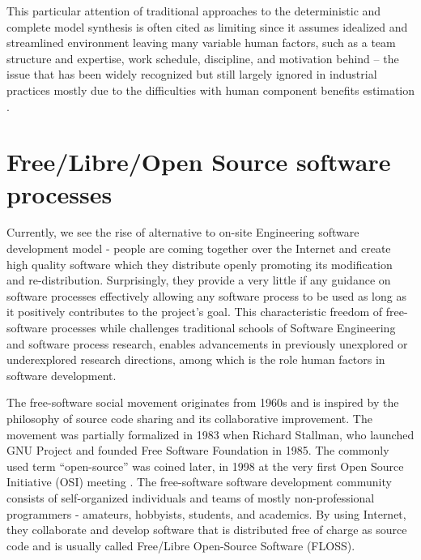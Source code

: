 This particular attention of traditional approaches to the deterministic and complete model synthesis 
is often cited as limiting since it assumes idealized and streamlined environment leaving many variable 
human factors, such as a team structure and expertise, work schedule, discipline, and motivation behind 
-- the issue that has been widely recognized 
\cite{citeulike:149387} \cite{citeulike:113403} \cite{citeulike:205322} \cite{citeulike:12798652} 
but still largely ignored in industrial practices mostly due to the  difficulties with human component 
benefits estimation \cite{citeulike:12798659} \cite{citeulike:12798662} \cite{csdl2-12-11}.

%
%
\section{Free/Libre/Open Source software processes}
Currently, we see the rise of alternative to on-site Engineering software development model - 
people are coming together over the Internet and create high quality software which they distribute 
openly promoting its modification and re-distribution. 
Surprisingly, they provide a very little if any guidance on software processes effectively allowing any 
software process to be used as long as it positively contributes to the project's goal. 
This characteristic freedom of free-software processes while challenges traditional schools of 
Software Engineering and software process research, enables advancements in previously unexplored or 
underexplored research directions, among which is the role human factors in software development.

The free-software social movement originates from 1960s and is inspired by the philosophy of 
source code sharing and its collaborative improvement. The movement was partially formalized in 1983 
when Richard Stallman, who launched GNU Project and founded Free Software Foundation in 1985.
The commonly used term ``open-source'' was coined later, in 1998 at the very first Open Source 
Initiative (OSI) meeting \cite{osi-history}.
The free-software software development community consists of self-organized individuals and teams of 
mostly non-professional programmers - amateurs, hobbyists, students, and academics. 
By using Internet, they collaborate and develop software that is distributed free of charge as source code
and is usually called Free/Libre Open-Source Software (FLOSS). 

